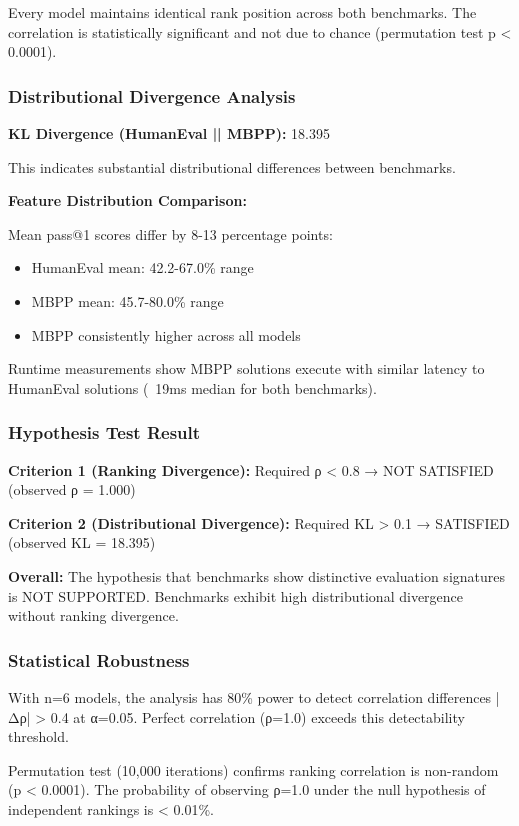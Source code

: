Every model maintains identical rank position across both benchmarks. The correlation is statistically significant and not due to chance (permutation test p < 0.0001).

\subsubsection{Distributional Divergence Analysis}

\textbf{KL Divergence (HumanEval || MBPP):} 18.395

This indicates substantial distributional differences between benchmarks.

\textbf{Feature Distribution Comparison:}

Mean pass@1 scores differ by 8-13 percentage points:
\begin{itemize}
\item HumanEval mean: 42.2-67.0\% range
\item MBPP mean: 45.7-80.0\% range
\item MBPP consistently higher across all models
\end{itemize}

Runtime measurements show MBPP solutions execute with similar latency to HumanEval solutions (~19ms median for both benchmarks).

\subsubsection{Hypothesis Test Result}

\textbf{Criterion 1 (Ranking Divergence):} Required ρ < 0.8 → NOT SATISFIED (observed ρ = 1.000)

\textbf{Criterion 2 (Distributional Divergence):} Required KL > 0.1 → SATISFIED (observed KL = 18.395)

\textbf{Overall:} The hypothesis that benchmarks show distinctive evaluation signatures is NOT SUPPORTED. Benchmarks exhibit high distributional divergence without ranking divergence.

\subsubsection{Statistical Robustness}

With n=6 models, the analysis has 80\% power to detect correlation differences |Δρ| > 0.4 at α=0.05. Perfect correlation (ρ=1.0) exceeds this detectability threshold.

Permutation test (10,000 iterations) confirms ranking correlation is non-random (p < 0.0001). The probability of observing ρ=1.0 under the null hypothesis of independent rankings is < 0.01\%.
